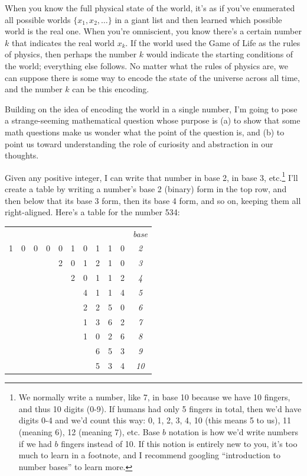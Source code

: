 \documentclass[9pt, twoside]{book}
\theoremstyle{argtstyle}
\begin{document}
When you know the full physical state of the world, it's as if you've
enumerated
all possible worlds $\{x_1, x_2, \ldots\}$ in a giant list and
then learned which possible world is the real one. When you're omniscient, you
know there's a certain number $k$ that indicates the real world $x_k$.
If the world used the Game of Life as the rules of physics, then perhaps the
number $k$ would indicate the starting conditions of the world; everything else
follows. No matter what the rules of physics are, we can suppose there is some
way to encode the state of the universe across all time, and the number
$k$ can be this encoding.

Building on the idea of encoding the world in a single number,
I'm going to pose a strange-seeming mathematical question whose purpose is
(a) to show that some math questions make us wonder what the
point of the question is, and (b) to point us toward understanding the role of
curiosity and abstraction in our thoughts.

Given any positive integer, I can write that number in base 2, in base 3,
etc.\footnote{We normally write a number, like 7, in base 10 because we have 10
fingers, and thus 10 digits (0-9). If humans had only 5 fingers in total, then
we'd have
digits 0-4 and we'd count this way: 0, 1, 2, 3, 4, 10 (this means 5 to us), 11
(meaning 6), 12 (meaning 7), etc. Base $b$ notation is how we'd write numbers if
we had $b$ fingers instead of 10. If this notion is entirely new to you, it's
too much to learn in a footnote, and I recommend googling ``introduction to
number bases'' to learn more.}
I'll create a table by writing a number's base 2 (binary)
form in the top row,
and then below that its base 3 form, then its base 4 form, and so on, keeping
them all right-aligned. Here's a table for the number 534:

\begin{center}
\begin{tabular}{cccccccccc|c}
  &   &   &   &   &   &   &   &   &   &\em base \\
1 & 0 & 0 & 0 & 0 & 1 & 0 & 1 & 1 & 0 & \it 2 \\
  &   &   &   & 2 & 0 & 1 & 2 & 1 & 0 & \it 3 \\
  &   &   &   &   & 2 & 0 & 1 & 1 & 2 & \it 4 \\
  &   &   &   &   &   & 4 & 1 & 1 & 4 & \it 5 \\
  &   &   &   &   &   & 2 & 2 & 5 & 0 & \it 6 \\
  &   &   &   &   &   & 1 & 3 & 6 & 2 & \it 7 \\
  &   &   &   &   &   & 1 & 0 & 2 & 6 & \it 8 \\
  &   &   &   &   &   &   & 6 & 5 & 3 & \it 9 \\
  &   &   &   &   &   &   & 5 & 3 & 4 & \it 10 \\
\end{tabular}
\end{center}
\end{document}
